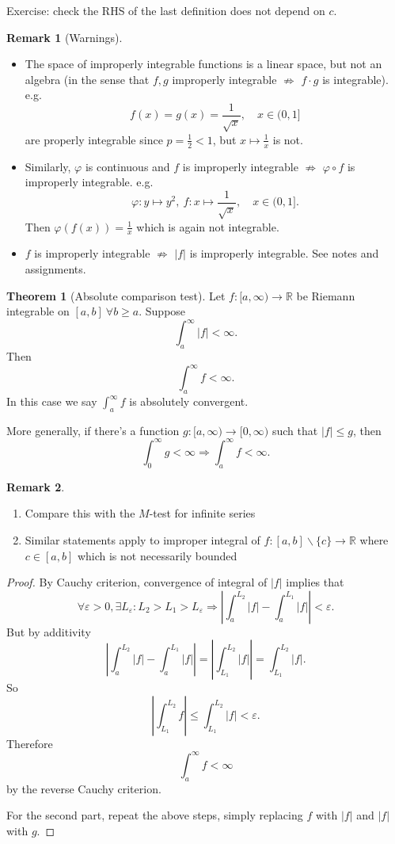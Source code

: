 \documentclass[a4paper]{article}
\theoremstyle{definition}
\newtheorem{thm}[defn]{Theorem}
\newtheorem*{remark}{Remark}
\begin{document}
Exercise: check the RHS of the last definition does not depend on $c$.
\begin{remark}[Warnings]
\begin{itemize}
    \item The space of improperly integrable functions is a linear space, but not an algebra (in the sense that $f,g$ improperly integrable $\not\Rightarrow$ $f\cdot g$ is integrable). e.g.
\[
f(x)=g(x)=\frac{1}{\sqrt{x}}, \quad x\in (0,1]
\]
are properly integrable since $p=\frac12<1$, but $x\mapsto \frac1x$ is not.
    \item Similarly, $\varphi$ is continuous and $f$ is improperly integrable $\not\Rightarrow$ $\varphi \circ f$ is improperly integrable. e.g.
\[
\varphi : y\mapsto y^2,\ f:x\mapsto \frac{1}{\sqrt{x}},\quad x\in (0,1].
\]
Then $\varphi (f(x))=\frac{1}{x}$ which is again not integrable.
    \item $f$ is improperly integrable $\not\Rightarrow$ $|f|$ is improperly integrable. See notes and assignments.
\end{itemize}
\end{remark}

\begin{thm}[Absolute comparison test]
Let $f:[a,\infty)\rightarrow \mathbb R$ be Riemann integrable on $[a,b] \ \forall b\geq a$. Suppose
\[
\int_a^\infty |f|<\infty .
\]
Then
\[
\int_a^\infty f < \infty .
\]
In this case we say $\int_a^\infty f$ is absolutely convergent.

More generally, if there's a function $g:[a,\infty)\rightarrow[0,\infty)$ such that $|f|\leq g$, then
\[
\int_0^\infty g <\infty \Rightarrow \int_a^\infty f <\infty.
\]
\end{thm}

\begin{remark}
\begin{enumerate}
    \item Compare this with the $M$-test for infinite series
    \item Similar statements apply to improper integral of $f:[a,b]\backslash \{c\}\rightarrow \mathbb R$ where $c\in [a,b]$ which is not necessarily bounded
\end{enumerate}
\end{remark}
\begin{proof}
By Cauchy criterion, convergence of integral of $|f|$ implies that
\[
\forall \varepsilon >0, \exists L_\varepsilon : L_2>L_1>L_\varepsilon \Rightarrow \left| \int_a^{L_2} |f|-\int_a^{L_1} |f| \right|<\varepsilon .
\]
But by additivity
\[
\left| \int_a^{L_2} |f|-\int_a^{L_1} |f| \right|=\left|\int_{L_1}^{L_2} |f| \right|=\int_{L_1}^{L_2} |f| .
\]
So
\[
\left|\int_{L_1}^{L_2} f \right|\leq\int_{L_1}^{L_2} |f|<\varepsilon .
\]
Therefore
\[
\int_a^\infty f <\infty
\]
by the reverse Cauchy criterion.

For the second part, repeat the above steps, simply replacing $f$ with $|f|$ and $|f|$ with $g$.
\end{proof}
\end{document}
